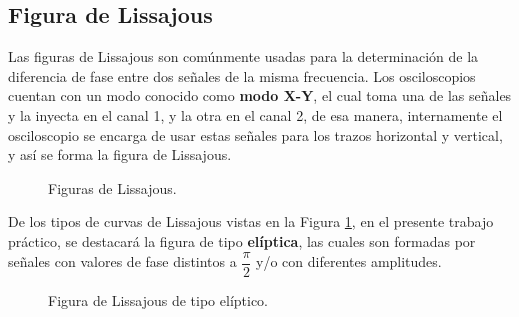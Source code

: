   \subsection{Figura de Lissajous}
               
      Las figuras de Lissajous son comúnmente usadas para la determinación de la diferencia
      de fase entre dos señales de la misma frecuencia. Los osciloscopios cuentan con un modo
      conocido como \textbf{modo X-Y}, el cual toma una de las señales y la inyecta en el canal
      1, y la otra en el canal 2, de esa manera, internamente el osciloscopio se encarga de 
      usar estas señales para los trazos horizontal y vertical, y así se forma la figura de
      Lissajous. 

         \begin{figure}[H]
            \centering
            \caption{Figuras de Lissajous.}
            \label{fig:LissajTipos}                 
         \end{figure}

      De los tipos de curvas de Lissajous vistas en la Figura \ref{fig:LissajTipos}, 
      en el presente trabajo práctico, se destacará la figura de tipo \textbf{elíptica}, 
      las cuales son formadas por señales con valores de fase distintos a $\dfrac{\pi}{2}$ 
      y/o con diferentes amplitudes.

      \begin{figure}[H]
         \centering
         \caption{Figura de Lissajous de tipo elíptico.}
         \label{fig:LissajElip}           
      \end{figure}
      

